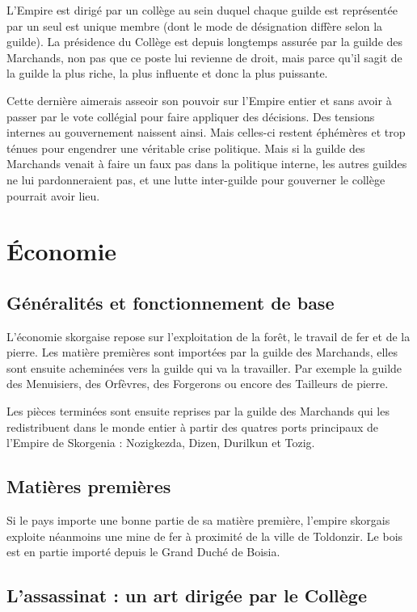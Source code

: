 \documentclass[french, a4paper, 12pt]{article}
\begin{document}
L'Empire est dirigé par un collège au sein duquel chaque guilde est représentée par un seul est unique membre (dont le mode de désignation diffère selon la guilde). La présidence du Collège est depuis longtemps assurée par la guilde des Marchands, non pas que ce poste lui revienne de droit, mais parce qu'il sagit de la guilde la plus riche, la plus influente et donc la plus puissante.

Cette dernière aimerais asseoir son pouvoir sur l'Empire entier et sans avoir à passer par le vote collégial pour faire appliquer des décisions. Des tensions internes au gouvernement naissent ainsi. Mais celles-ci restent éphémères et trop ténues pour engendrer une véritable crise politique. Mais si la guilde des Marchands venait à faire un faux pas dans la politique interne, les autres guildes ne lui pardonneraient pas, et une lutte inter-guilde pour gouverner le collège pourrait avoir lieu.

\section{Économie}

\subsection{Généralités et fonctionnement de base}

L'économie skorgaise repose sur l'exploitation de la forêt, le travail de fer et de la pierre. Les matière premières sont importées par la guilde des Marchands, elles sont ensuite acheminées vers la guilde qui va la travailler. Par exemple la guilde des Menuisiers, des Orfèvres, des Forgerons ou encore des Tailleurs de pierre.

Les pièces terminées sont ensuite reprises par la guilde des Marchands qui les redistribuent dans le monde entier à partir des quatres ports principaux de l'Empire de Skorgenia : Nozigkezda, Dizen, Durilkun et Tozig.

\subsection{Matières premières}

Si le pays importe une bonne partie de sa matière première, l'empire skorgais exploite néanmoins une mine de fer à proximité de la ville de Toldonzir. Le bois est en partie importé depuis le Grand Duché de Boisia.

\subsection{L'assassinat : un art dirigée par le Collège}
\end{document}
